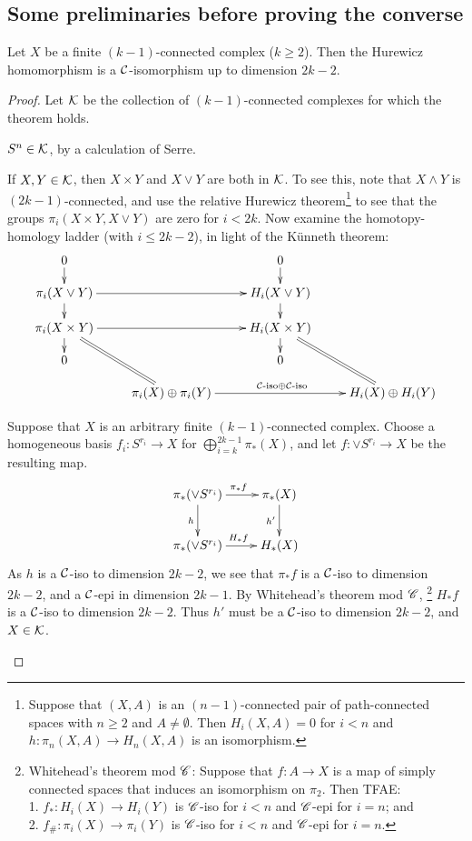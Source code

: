 \documentclass[11pt]{article}
\begin{document}
\begin{SignatureThmTalk}
\subsection*{Some preliminaries before proving the converse}
\begin{thm*}[18.3]
Let $X$ be a finite $(k-1)$-connected complex ($k\geq2$). Then the Hurewicz homomorphism is a $\mathcal{C}$-isomorphism up to dimension $2k-2$.
\end{thm*}
\begin{proof}Let $\mathcal{K}$ be the collection of $(k-1)$-connected complexes for which the theorem holds.
\begin{itemise}
\item $S^n\in\mathcal{K}$, by a calculation of Serre.
\item If $X,Y\in\mathcal{K}$, then $X\times Y$ and $X\vee Y$ are both in $\mathcal{K}$. To see this, note that $X\wedge Y$ is $(2k-1)$-connected, and use the relative Hurewicz theorem\footnote{Suppose that $(X,A)$ is an $(n-1)$-connected pair of path-connected spaces with $n\geq2$ and $A\neq\emptyset$. Then $H_i(X,A)=0$ for $i<n$ and $h:\pi_n(X,A)\to H_n(X,A)$ is an isomorphism.} to see that the groups $\pi_i(X\times Y,X\vee Y)$ are zero for $i<2k$. Now examine the homotopy-homology ladder (with $i\leq2k-2$), in light of the K\"unneth theorem:
\[\xymatrix@R=.4cm{
0\ar[d]&&0\ar[d]\\
\pi_i(X\vee Y)\ar[d]\ar[rr]&&H_i(X\vee Y)\ar[d]\\
\ar[d]\pi_i(X\times Y)\ar@{=}[rdd]\ar[rr]&&H_i(X\times Y)\ar@{=}[rdd]\ar[d]\\
0&&0\\
&\pi_i(X)\oplus\pi_i(Y)\ar[rr]^{\calC\text{-iso}\oplus\calC\text{-iso}}&&H_i(X)\oplus H_i(Y)
}\]
\item Suppose that $X$ is an arbitrary finite $(k-1)$-connected complex. Choose a homogeneous basis $f_i:S^{r_i}\to X$ for $\bigoplus_{i=k}^{2k-1}\pi_*(X)$, and let $f:\vee S^{r_i}\to X$ be the resulting map.
\[\xymatrix{
\ar[d]_h\pi_*(\vee S^{r_i})\ar[r]^{\pi_*f}& \pi_*(X)\ar[d]_{h'}\\
\pi_*(\vee S^{r_i})\ar[r]^{H_*f}&H_*(X)
}\]
As $h$ is a $\mathcal{C}$-iso to dimension $2k-2$, we see that $\pi_*f$ is a $\mathcal{C}$-iso to dimension $2k-2$, and a $\mathcal{C}$-epi in dimension $2k-1$. By Whitehead's theorem mod $\mathscr{C}$,%
\footnote{Whitehead's theorem mod $\mathscr{C}$:
Suppose that $f:A\to X$ is a map of simply connected spaces that induces an isomorphism on $\pi_2$. Then TFAE:\\
\phantom{Space}1. $f_*:H_i(X)\to H_i(Y)$ is $\mathscr{C}$-iso for $i<n$ and $\mathscr{C}$-epi for $i=n$; and\\
\phantom{Space}2. $f_\#:\pi_i(X)\to \pi_i(Y)$ is $\mathscr{C}$-iso for $i<n$ and $\mathscr{C}$-epi for $i=n$.}
$H_*f$ is a $\mathcal{C}$-iso to dimension $2k-2$. Thus $h'$ must be a $\mathcal{C}$-iso  to dimension $2k-2$, and $X\in\mathcal{K}$.\qedhere
\end{itemise}
\end{proof}


\end{SignatureThmTalk}
\end{document}
